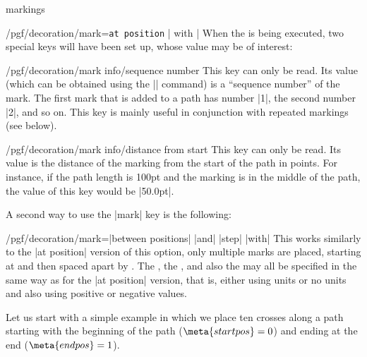 \begin{decoration}{markings}
\begin{key}{/pgf/decoration/mark=\texttt{at position} | with |}
        When the  is being executed, two special keys will have been
        set up, whose value may be of interest:
        \begin{key}{/pgf/decoration/mark info/sequence number}
            This key can only be read. Its value (which can be obtained using
            the |\pgfkeysvalueof| command) is a ``sequence number'' of the
            mark. The first mark that is added to a path has number |1|, the
            second number |2|, and so on. This key is mainly useful in
            conjunction with repeated markings (see below).
        \end{key}
        \begin{key}{/pgf/decoration/mark info/distance from start}
            This key can only be read. Its value is the distance of the marking
            from the start of the path in points. For instance, if the path
            length is 100pt and the marking is in the middle of the path, the
            value of this key would be |50.0pt|.
        \end{key}
    \end{key}

    A second way to use the |mark| key is the following:
    \begin{key}{/pgf/decoration/mark=|between positions|
             |and|  |step|
             |with| %
    }
        This works similarly to the |at position| version of this option, only
        multiple marks are placed, starting at  and then spaced
        apart by . The , the , and
        also the  may all be specified in the same way as for
        the |at position| version, that is, either using units or no units and
        also using positive or negative values.

        Let us start with a simple example in which we place ten crosses along
        a path starting with the beginning of the path ($\meta{start pos} = 0$)
        and ending at the end ($\meta{end pos} = 1$).
\begin{codeexample}[preamble={\usetikzlibrary{decorations.markings}}]
\end{codeexample}


\end{key}
\end{decoration}

